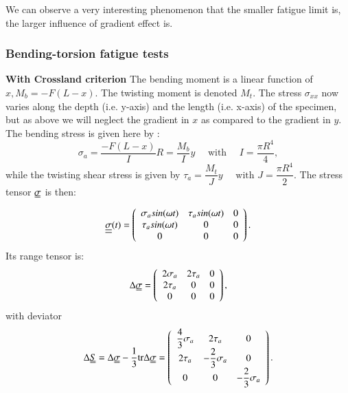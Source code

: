 \documentclass[3p,times,procedia,number]{elsarticle}
\begin{document}
We can observe a very interesting phenomenon that the smaller fatigue limit is, the larger influence of gradient effect is.


\subsubsection{Bending-torsion fatigue tests}
\textbf{With Crossland criterion}
The bending moment is a linear function of $x, M_b= -F(L-x)$. The twisting moment is denoted $M_t$. The stress $\sigma_{xx}$ now varies along the depth (i.e. y-axis) and the length (i.e. x-axis) of the specimen, but as above we will neglect the gradient in $x$ as compared to the gradient in $y$. The bending stress is given here by : 
\begin{equation}
\sigma_{a}=\dfrac{-F(L-x)}{I}R=\dfrac{M_b}{I}y \quad \text{ with } \quad I=\dfrac{\pi R^4}{4},
\end{equation}
while the twisting shear stress is given by 
$ \tau_{a}=\dfrac{M_t}{J}y \quad \text{ with  }
J=\dfrac{\pi R^4}{2}$. 
The stress tensor $\uuline{\sigma}$ is then:
\begin{equation} 
\uline{\uline{\sigma}}(t)=
\left(
\begin{array}{ccc}
\sigma_{a}sin(\omega t) & \tau_asin(\omega t) & 0\\
\tau_asin(\omega t) & 0 & 0\\ 
0 & 0 & 0\\
\end{array}\right) .
\end{equation}
Its range tensor is:
\begin{equation} 
\Delta\uuline{\sigma}=
\left(
\begin{array}{ccc}
2\sigma_a& 2\tau_a & 0\\
2\tau_a& 0 & 0\\ 
0 & 0 & 0\\
\end{array}\right) ,
\end{equation}
with deviator
\begin{equation} 
\Delta\uuline{ S}=\Delta\uuline{\sigma}-\dfrac{1}{3}\textrm{tr}\Delta\uuline{\sigma}=
\left(
\begin{array}{ccc}
\dfrac{4}{3}\sigma_{a} & 2\tau_a & 0\\
2\tau_a & -\dfrac{2}{3}\sigma_a & 0\\ 
0 & 0 & -\dfrac{2}{3}\sigma_a\\
\end{array}\right) .
\end{equation}
\end{document}
